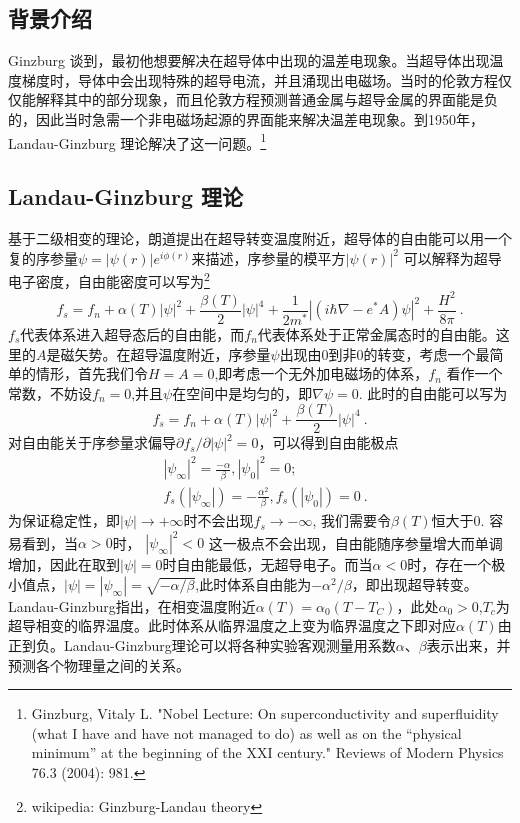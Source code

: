 

\subsection{背景介绍}
Ginzburg 谈到，最初他想要解决在超导体中出现的温差电现象。当超导体出现温度梯度时，导体中会出现特殊的超导电流，并且涌现出电磁场。当时的伦敦方程仅仅能解释其中的部分现象，而且伦敦方程预测普通金属与超导金属的界面能是负的，因此当时急需一个非电磁场起源的界面能来解决温差电现象。到1950年，Landau-Ginzburg 理论解决了这一问题。\footnote{Ginzburg, Vitaly L. "Nobel Lecture: On superconductivity and superfluidity (what I have and have not managed to do) as well as on the “physical minimum” at the beginning of the XXI century." Reviews of Modern Physics 76.3 (2004): 981.}
\subsection{Landau-Ginzburg 理论}
基于二级相变的理论，朗道提出在超导转变温度附近，超导体的自由能可以用一个复的序参量$\psi = |\psi(r)|e^{i\phi(r)}$来描述，序参量的模平方$|\psi(r)|^2$ 可以解释为超导电子密度，自由能密度可以写为\footnote{wikipedia: Ginzburg-Landau theory}
\begin{equation}
f_s = f_n + \alpha(T) |\psi|^2 + \frac{\beta(T)}{2} |\psi|^4 + \frac{1}{2m^*} \left| \left(i\hbar \nabla - e^* A \right)\psi \right|^2 + \frac{H^2}{8\pi} \label{eq_gl_1}~.
\end{equation}
$f_s$代表体系进入超导态后的自由能，而$f_n$代表体系处于正常金属态时的自由能。这里的$A$是磁矢势。在超导温度附近，序参量$\psi$出现由0到非0的转变，考虑一个最简单的情形，首先我们令$H=A = 0$,即考虑一个无外加电磁场的体系，$f_n$ 看作一个常数，不妨设$f_n=0$,并且$\psi$在空间中是均匀的，即$\nabla \psi = 0$. 此时的自由能可以写为
\begin{equation}
f_s = f_n + \alpha(T) |\psi|^2 + \frac{\beta(T)}{2} |\psi|^4 ~.
\end{equation}
对自由能关于序参量求偏导$\partial f_s /\partial |\psi|^2 = 0$，可以得到自由能极点
\begin{align}
&|\psi_{\infty}|^2 = \frac{-\alpha}{\beta},|\psi_0|^2 = 0;\\
&f_s(|\psi_{\infty}|) = -\frac{\alpha^2}{\beta}, f_s(|\psi_0|) = 0 ~.
\end{align}
为保证稳定性，即$|\psi|\rightarrow +\infty$时不会出现$f_s \rightarrow -\infty$, 我们需要令$\beta(T)$恒大于0. 容易看到，当$\alpha>0$时， $|\psi_\infty|^2 <0$ 这一极点不会出现，自由能随序参量增大而单调增加，因此在取到$|\psi|=0$时自由能最低，无超导电子。而当$\alpha<0$时，存在一个极小值点，$|\psi| = |\psi_{\infty}| = \sqrt{-\alpha/\beta}$,此时体系自由能为$-\alpha^2/\beta$，即出现超导转变。Landau-Ginzburg指出，在相变温度附近$\alpha(T) = \alpha_0 (T - T_C)$，此处$\alpha_0 > 0$,$T_c$为超导相变的临界温度。此时体系从临界温度之上变为临界温度之下即对应$\alpha(T)$由正到负。Landau-Ginzburg理论可以将各种实验客观测量用系数$\alpha$、$\beta$表示出来，并预测各个物理量之间的关系。
